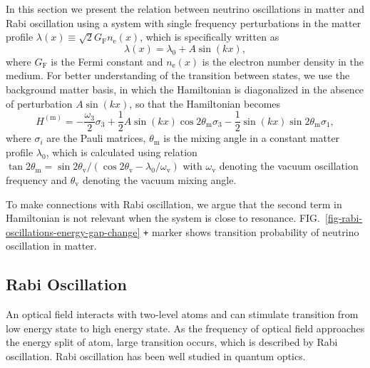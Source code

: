 \documentclass[%
preprint,
 amsmath,amssymb,
 aps,
]{revtex4-1}
\begin{document}


In this section we present the relation between neutrino oscillations in matter and Rabi oscillation using a system with single frequency perturbations in the matter profile $\lambda(x)\equiv\sqrt{2}G_{\mathrm F} n_{\mathrm e}(x)$, which is specifically written as
\begin{equation}
    \lambda(x) = \lambda_0 + A \sin (k x) ,
\end{equation}
where $G_{\mathrm F}$ is the Fermi constant and $n_{\mathrm e}(x)$ is the electron number density in the medium. For better understanding of the transition between states, we use the background matter basis, in which the Hamiltonian is diagonalized in the absence of perturbation $A\sin(kx)$, so that the Hamiltonian becomes
\begin{equation}
    H^{(\mathrm{m})} = -\frac{\omega_3}{2} \sigma_3 + \frac{1}{2} A\sin (kx) \cos 2\theta_{\mathrm m} \sigma_3 -\frac{1}{2} \sin(kx) \sin 2\theta_{\mathrm m} \sigma_1,\label{neutrino-matter-single-frequency-hamiltonian}
\end{equation}
where $\sigma_i$ are the Pauli matrices, $\theta_{\mathrm m}$ is the mixing angle in a constant matter profile $\lambda_0$, which is calculated using relation $\tan 2\theta_{\mathrm{m}}=\sin 2\theta_{\mathrm v}/\left( \cos 2\theta_{\mathrm v} - \lambda_0/\omega_{\mathrm v} \right)$ with $\omega_{\mathrm v}$ denoting the vacuum oscillation frequency and $\theta_{\mathrm v}$ denoting the vacuum mixing angle.

To make connections with Rabi oscillation, we argue that the second term in Hamiltonian is not relevant when the system is close to resonance. FIG.~\ref{fig-rabi-oscillations-energy-gap-change} \verb|+| marker shows transition probability of neutrino oscillation in matter.





\subsection{Rabi Oscillation}


An optical field interacts with two-level atoms and can stimulate transition from low energy state to high energy state. As the frequency of optical field approaches the energy split of atom, large transition occurs, which is described by Rabi oscillation. Rabi oscillation has been well studied in quantum optics.\cite{Boyd2008} 
\end{document}
